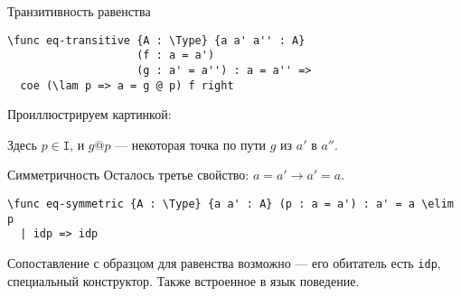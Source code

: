 \documentclass[aspectratio=169,dvipsnames,usenames]{beamer}
\begin{document}
\begin{frame}[fragile]{Транзитивность равенства}


\small\color[HTML]{025002}\begin{verbatim}
\func eq-transitive {A : \Type} {a a' a'' : A}
                    (f : a = a')
                    (g : a' = a'') : a = a'' =>
  coe (\lam p => a = g @ p) f right
\end{verbatim}\normalsize
\color{black}




Проиллюстрируем картинкой:\vspace{-0.2cm}
\begin{center}\end{center}\vspace{-0.3cm}
Здесь $p \in \texttt{I}$, и $g @ p$ --- некоторая точка по пути $g$ из $a'$ в $a''$.

\end{frame}

\begin{frame}[fragile]{Симметричность}
Осталось третье свойство: $a = a' \rightarrow a' = a$.

\small\color[HTML]{025002}\begin{verbatim}
\func eq-symmetric {A : \Type} {a a' : A} (p : a = a') : a' = a \elim p
  | idp => idp
\end{verbatim}\normalsize
\color{black}

Сопоставление с образцом для равенства возможно --- 
его обитатель есть \verb!idp!, специальный конструктор. Также встроенное в язык поведение.


\end{frame}
\end{document}
